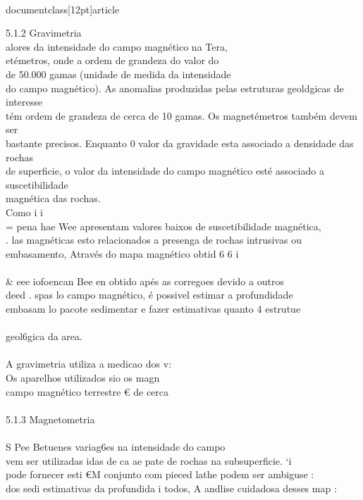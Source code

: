 \\documentclass[12pt]{article}
\begin{document}
5.1.2 Gravimetria\\
alores da intensidade do campo magnético na Tera,\\
etémetros, onde a ordem de grandeza do valor do\\
de 50.000 gamas (unidade de medida da intensidade\\
do campo magnético). As anomalias produzidas pelas estruturas geoldgicas de interesse\\
tém ordem de grandeza de cerca de 10 gamas. Os magnetémetros também devem ser\\
bastante precisos. Enquanto 0 valor da gravidade esta associado a densidade das rochas\\
de superficie, o valor da intensidade do campo magnético esté associado a suscetibilidade\\
magnética das rochas.\\
Como i i\\
= pena hae Wee apresentam valores baixos de suscetibilidade magnética,\\
. las magnéticas esto relacionados a presenga de rochas intrusivas ou\\
embasamento, Através do mapa magnético obtid 6 6 i\\
\\& eee iofoencan Bee en obtido apés as corregoes devido a outros\\
deed . spas lo campo magnético, é possivel estimar a profundidade\\
embasam lo pacote sedimentar e fazer estimativas quanto 4 estrutue\\
\\
geol6gica da area.\\
\\
A gravimetria utiliza a medicao dos v:\\
Os aparelhos utilizados sio os magn\\
campo magnético terrestre € de cerca\\
\\
5.1.3 Magnetometria\\
\\
S Pee Betuenes variag6es na intensidade do campo\\
vem ser utilizadas idas de ca ae pate de rochas na subsuperficie. ‘i\\
pode fornecer esti €M conjunto com pieced lathe podem ser ambiguse :\\
dos sedi estimativas da profundida i todos, A andlise cuidadosa desses map :\\
\end{document}
